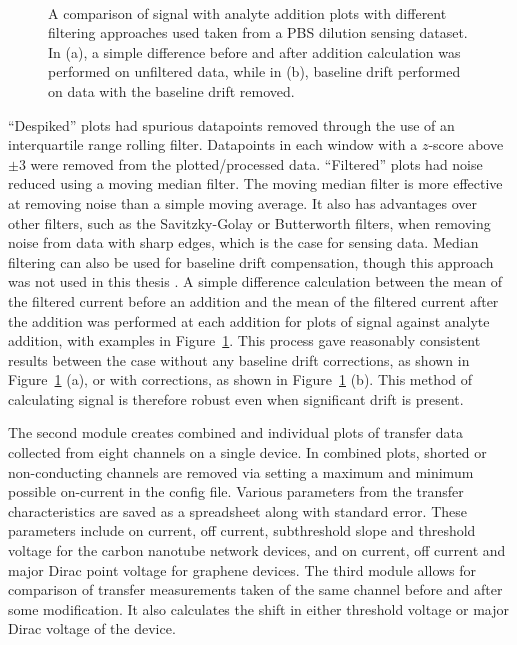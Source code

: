 \documentclass[
  a4paper,
]{scrbook}
\begin{document}
\begin{figure}
\begin{minipage}[t]{0.65\linewidth}
{{}

}

\end{minipage}%
%
\begin{minipage}[t]{0.17\linewidth}

{\centering 

~

}

\end{minipage}%

\caption[A comparison of signal with analyte addition plots with
different filtering approaches used.]{\label{fig-spaa-plot-comparison}A
comparison of signal with analyte addition plots with different
filtering approaches used taken from a PBS dilution sensing dataset. In
(a), a simple difference before and after addition calculation was
performed on unfiltered data, while in (b), baseline drift performed on
data with the baseline drift removed.}

\end{figure}

``Despiked'' plots had spurious datapoints removed through the use of an
interquartile range rolling filter. Datapoints in each window with a
\(z\)-score above \(\pm 3\) were removed from the plotted/processed
data. ``Filtered'' plots had noise reduced using a moving median filter.
The moving median filter is more effective at removing noise than a
simple moving average. It also has advantages over other filters, such
as the Savitzky-Golay or Butterworth filters, when removing noise from
data with sharp edges, which is the case for sensing data. Median
filtering can also be used for baseline drift compensation, though this
approach was not used in this thesis \autocite{Stone2011}. A simple
difference calculation between the mean of the filtered current before
an addition and the mean of the filtered current after the addition was
performed at each addition for plots of signal against analyte addition,
with examples in Figure~\ref{fig-spaa-plot-comparison}. This process
gave reasonably consistent results between the case without any baseline
drift corrections, as shown in Figure~\ref{fig-spaa-plot-comparison}
(a), or with corrections, as shown in
Figure~\ref{fig-spaa-plot-comparison} (b). This method of calculating
signal is therefore robust even when significant drift is present.

The second module creates combined and individual plots of transfer data
collected from eight channels on a single device. In combined plots,
shorted or non-conducting channels are removed via setting a maximum and
minimum possible on-current in the config file. Various parameters from
the transfer characteristics are saved as a spreadsheet along with
standard error. These parameters include on current, off current,
subthreshold slope and threshold voltage for the carbon nanotube network
devices, and on current, off current and major Dirac point voltage for
graphene devices. The third module allows for comparison of transfer
measurements taken of the same channel before and after some
modification. It also calculates the shift in either threshold voltage
or major Dirac voltage of the device.
\end{document}
